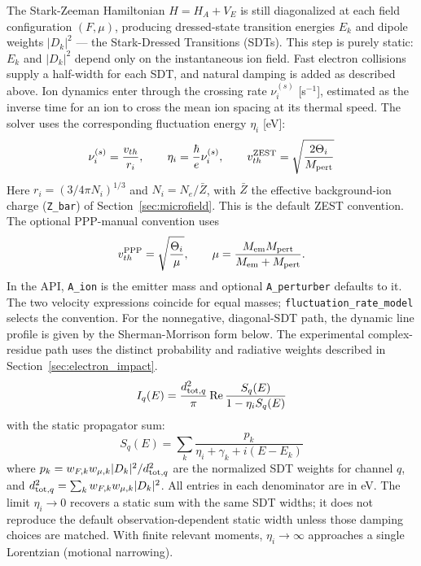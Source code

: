 \documentclass[11pt,a4paper]{article}
\numberwithin{equation}{section}
\begin{document}
The Stark-Zeeman Hamiltonian $H = H_A + V_E$ is still diagonalized at each field configuration $(F,\mu)$, producing dressed-state transition energies $E_k$ and dipole weights $|D_k|^2$ — the Stark-Dressed Transitions (SDTs). This step is purely static: $E_k$ and $|D_k|^2$ depend only on the instantaneous ion field. Fast electron collisions supply a half-width for each SDT, and natural damping is added as described above. Ion dynamics enter through the crossing rate $\nu_i^{(s)}$ [s$^{-1}$], estimated as the inverse time for an ion to cross the mean ion spacing at its thermal speed. The solver uses the corresponding fluctuation energy $\eta_i$ [eV]:
\begin{equation}
\nu_i^{(s)} = \frac{v_{th}}{r_i},\qquad
\eta_i=\frac{\hbar}{e}\nu_i^{(s)},\qquad
v_{th}^{\rm ZEST} = \sqrt{\frac{2\Theta_i}{M_{\rm pert}}}
\end{equation}
Here $r_i=(3/4\pi N_i)^{1/3}$ and $N_i=N_e/\bar Z$, with $\bar Z$ the effective
background-ion charge (\texttt{Z\_bar}) of Section~\ref{sec:microfield}.
This is the default ZEST convention. The optional PPP-manual convention uses
\begin{equation}
v_{th}^{\rm PPP}=\sqrt{\frac{\Theta_i}{\mu}},\qquad
\mu=\frac{M_{\rm em}M_{\rm pert}}{M_{\rm em}+M_{\rm pert}}.
\end{equation}
In the API, \texttt{A\_ion} is the emitter mass and optional
\texttt{A\_perturber} defaults to it. The two velocity expressions coincide
for equal masses; \texttt{fluctuation\_rate\_model} selects the convention.
For the nonnegative, diagonal-SDT path, the dynamic line profile is given by
the Sherman-Morrison form below. The experimental complex-residue path uses
the distinct probability and radiative weights described in
Section~\ref{sec:electron_impact}.
\begin{equation}
I_q(E) = \frac{d_{{\rm tot},q}^2}{\pi} \operatorname{Re} \frac{S_q(E)}{1 - \eta_i S_q(E)}
\end{equation}
with the static propagator sum:
\begin{equation}
S_q(E) = \sum_k \frac{p_k}{\eta_i + \gamma_k + i(E - E_k)}
\end{equation}
where $p_k = w_{F,k}w_{\mu,k}|D_k|^2 / d_{{\rm tot},q}^2$ are the normalized SDT weights for channel $q$, and $d_{{\rm tot},q}^2 = \sum_k w_{F,k}w_{\mu,k}|D_k|^2$. All entries in each denominator are in eV.
The limit $\eta_i \to 0$ recovers a static sum with the same SDT widths;
it does not reproduce the default observation-dependent static width unless
those damping choices are matched. With finite relevant moments,
$\eta_i \to \infty$ approaches a single Lorentzian (motional narrowing).
\end{document}
